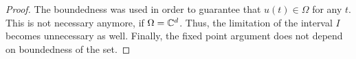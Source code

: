 \begin{proof}
  The boundedness was used in order to guarantee that $u(t)\in \Omega$
  for any $t$. This is not necessary anymore, if $\Omega =
  \mathbb C^d$. Thus, the limitation of the interval $I$ becomes unnecessary
  as well. Finally, the fixed point argument does not depend on
  boundedness of the set.
\end{proof}




